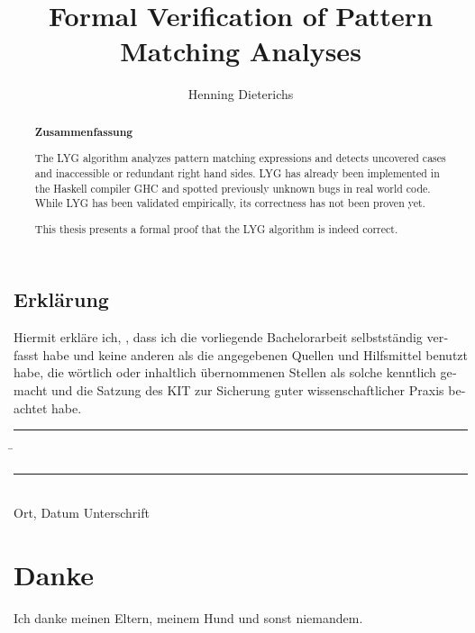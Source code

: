 \documentclass[parskip=no,12pt,a4paper,twoside,headings=openright]{scrreprt}
\title{Formal Verification of Pattern Matching Analyses}
\author{Henning Dieterichs}
\begin{document}
\begin{otherlanguage}{ngerman} %
	\mytitlepage
\end{otherlanguage}

\begin{abstract}
	\begin{center}\Huge\textbf{\textsf{Zusammenfassung}}
	\end{center}
	\vfill


	\vfill

	The LYG algorithm analyzes pattern matching expressions and detects uncovered cases and inaccessible or redundant right hand sides.
	LYG has already been implemented in the Haskell compiler GHC and spotted previously unknown bugs in real world code.
	While LYG has been validated empirically, its correctness has not been proven yet.

	This thesis presents a formal proof that the LYG algorithm is indeed correct.
	\vfill


\end{abstract}

\tableofcontents











\begin{otherlanguage}{ngerman}
	\chapter*{Erklärung}
	\pagestyle{empty}

	\vspace{20mm}
	Hiermit erkläre ich, \theauthor, dass ich die vorliegende Bachelorarbeit selbst\-ständig
	verfasst habe und keine anderen als die angegebenen Quellen und Hilfsmittel
	benutzt habe, die wörtlich oder inhaltlich übernommenen Stellen als solche kenntlich gemacht und
	die Satzung des KIT zur Sicherung guter wissenschaftlicher Praxis beachtet habe.
	\vspace{20mm}
	\begin{tabbing}
		\rule{7cm}{.4pt}\hspace{1cm} \= \rule{6.8cm}{.4pt} \\
		Ort, Datum \> Unterschrift
	\end{tabbing}
\end{otherlanguage}

\chapter*{Danke}
\pagestyle{empty}

Ich danke meinen Eltern, meinem Hund und sonst niemandem.

\pagestyle{fancy}
\end{document}

